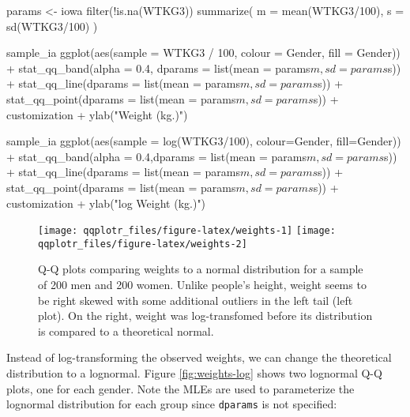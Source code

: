 \begin{Schunk}
\begin{Sinput}
params <- iowa %>% 
  filter(!is.na(WTKG3)) %>% 
  summarize(
    m = mean(WTKG3/100),
    s = sd(WTKG3/100)
  )

sample_ia %>% 
  ggplot(aes(sample = WTKG3 / 100, colour = Gender, fill = Gender)) + 
  stat_qq_band(alpha = 0.4,
               dparams = list(mean = params$m, sd = params$s)) + 
  stat_qq_line(dparams = list(mean = params$m, sd = params$s)) + 
  stat_qq_point(dparams = list(mean = params$m, sd = params$s)) +
  customization +
  ylab("Weight (kg.)")

sample_ia %>% 
  ggplot(aes(sample = log(WTKG3/100), colour=Gender, fill=Gender)) + 
  stat_qq_band(alpha = 0.4,dparams = list(mean = params$m, sd = params$s)) + 
  stat_qq_line(dparams = list(mean = params$m, sd = params$s)) + 
  stat_qq_point(dparams = list(mean = params$m, sd = params$s)) +
  customization +
  ylab("log Weight (kg.)")
\end{Sinput}
\begin{figure}

{\centering \texttt{[image: qqplotr\_files/figure-latex/weights-1]} \texttt{[image: qqplotr\_files/figure-latex/weights-2]} 

}

\caption[Q-Q plots comparing weights to a normal distribution for a sample of 200 men and 200 women]{Q-Q plots comparing weights to a normal distribution for a sample of 200 men and 200 women. Unlike people's height, weight seems to be right skewed with some additional outliers in the left tail (left plot). On the right, weight was log-transfomed before its distribution is compared to a theoretical normal.}\label{fig:weights}
\end{figure}
\end{Schunk}

Instead of log-transforming the observed weights, we can change the
theoretical distribution to a lognormal. Figure \ref{fig:weights-log}
shows two lognormal Q-Q plots, one for each gender. Note the MLEs are
used to parameterize the lognormal distribution for each group since
\texttt{dparams} is not specified:

